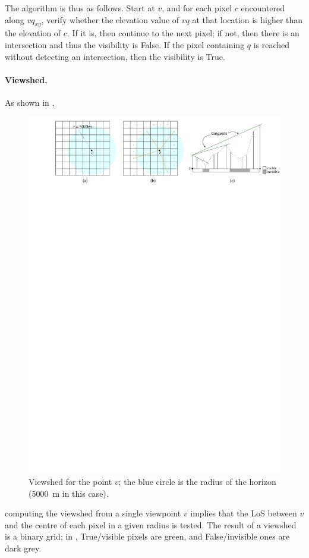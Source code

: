The algorithm is thus as follows.
Start at $v$, and for each pixel $c$ encountered along $vq_{xy}$, verify whether the elevation value of $vq$ at that location is higher than the elevation of $c$.
If it is, then continue to the next pixel; if not, then there is an intersection and thus the visibility is False.
If the pixel containing $q$ is reached without detecting an intersection, then the visibility is True.


\paragraph{Viewshed.}
As shown in ,
\begin{figure}
  \centering
  \includegraphics[width=\linewidth]{figs/viewshed}
  \caption{Viewshed for the point $v$; the blue circle is the radius of the horizon (\qty{5000}{\m} in this case).}%
\end{figure}
computing the viewshed from a single viewpoint $v$ implies that the LoS between $v$ and the centre of each pixel in a given radius is tested. 
The result of a viewshed is a binary grid; in , True/visible pixels are green, and False/invisible ones are dark grey.

